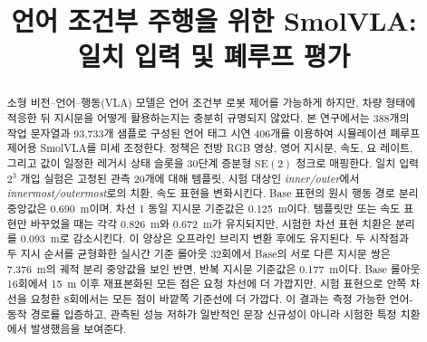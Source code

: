\documentclass[letterpaper,conference]{IEEEtran}
\newcommand{\seTwo}{\mathrm{SE}(2)}
\begin{document}
\title{언어 조건부 주행을 위한 SmolVLA:\\
일치 입력 및 폐루프 평가}

\author{
\and
{}
\and
{}
\and
{}
}

\maketitle

\begin{abstract}
소형 비전--언어--행동(VLA) 모델은 언어 조건부 로봇 제어를 가능하게 하지만,
차량 형태에 적응한 뒤 지시문을 어떻게 활용하는지는 충분히 규명되지 않았다.
본 연구에서는 388개의 작업 문자열과 93,733개 샘플로 구성된 언어 태그 시연
406개를 이용하여 시뮬레이션 폐루프 제어용 SmolVLA를 미세 조정한다. 정책은 전방
RGB 영상, 영어 지시문, 속도, 요 레이트, 그리고 값이 일정한 레거시 상태 슬롯을
30단계 증분형 $\seTwo$ 청크로 매핑한다. 일치 입력 $2^3$ 개입 실험은 고정된 관측
20개에 대해 템플릿, 시험 대상인 \emph{inner/outer}에서
\emph{innermost/outermost}로의 치환, 속도 표현을 변화시킨다. Base 표현의 원시
행동 경로 분리 중앙값은 0.690~m이며, 차선 1 동일 지시문 기준값은 0.125~m이다.
템플릿만 또는 속도 표현만 바꾸었을 때는 각각 0.826~m와 0.672~m가 유지되지만,
시험한 차선 표현 치환은 분리를 0.093~m로 감소시킨다. 이 양상은 오프라인 브리지
변환 후에도 유지된다. 두 시작점과 두 지시 순서를 균형화한 실시간 기준 롤아웃
32회에서 Base의 서로 다른 지시문 쌍은 7.376~m의 궤적 분리 중앙값을 보인 반면,
반복 지시문 기준값은 0.177~m이다. Base 롤아웃 16회에서 15~m 이후 재표본화된
모든 점은 요청 차선에 더 가깝지만, 시험 표현으로 안쪽 차선을 요청한 8회에서는
모든 점이 바깥쪽 기준선에 더 가깝다. 이 결과는 측정 가능한 언어-동작 경로를
입증하고, 관측된 성능 저하가 일반적인 문장 신규성이 아니라 시험한 특정 치환에서
발생했음을 보여준다.
\end{abstract}
\end{document}

